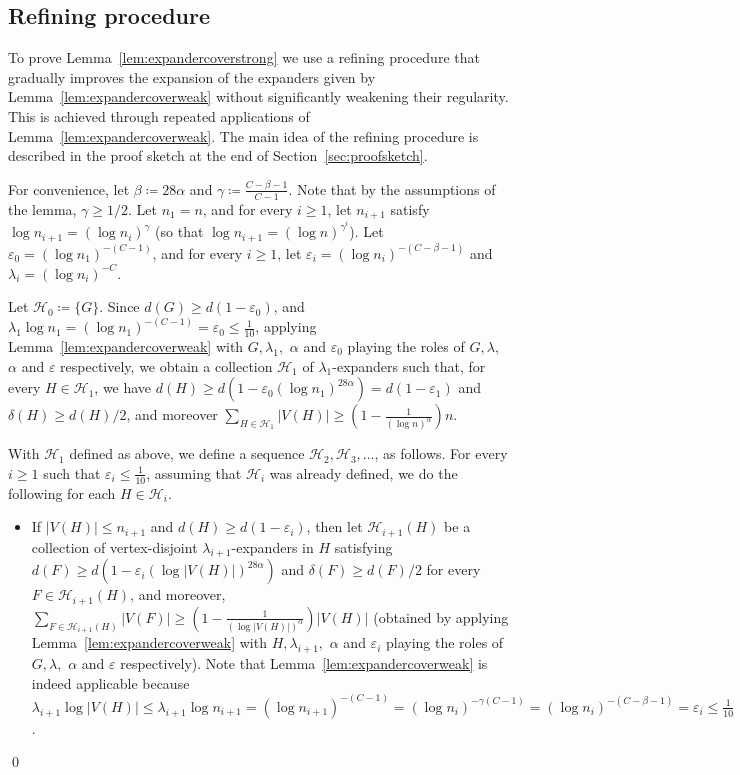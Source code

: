 \documentclass[10pt]{article}
\theoremstyle{plain}
\numberwithin{theorem}{section}
\theoremstyle{definition}
\theoremstyle{remark}
\renewenvironment{proof}[1][]{\begin{trivlist}
\item[\hspace{\labelsep}{\bf\noindent Proof#1.\/}] }{\qed\end{trivlist}}
\newcommand{\cH}{\mathcal{H}}
\newcommand{\eps}{\varepsilon}
\theoremstyle{plain}
\begin{document}
\subsection{Refining procedure}
 \label{subsec:refiningthepacking}


To prove Lemma~\ref{lem:expandercoverstrong} we use a refining procedure that gradually improves the expansion of the expanders given by Lemma~\ref{lem:expandercoverweak} without significantly weakening their regularity. This is achieved through repeated applications of Lemma~\ref{lem:expandercoverweak}. The main idea of the refining procedure is described in the proof sketch at the end of Section~\ref{sec:proofsketch}.

\begin{proof}[ of Lemma~\ref{lem:expandercoverstrong}]
	For convenience, let $\beta \coloneqq 28 \alpha$ and $\gamma \coloneqq \frac{C - \beta - 1}{C-1}$. 
	Note that by the assumptions of the lemma, $\gamma \ge 1/2$. Let $n_1 = n$, and for every $i \ge 1$, let $n_{i+1}$ satisfy $\log n_{i+1} = (\log n_{i})^{\gamma}$ (so that $\log n_{i+1} = (\log n)^{\gamma^{i}}$). Let $\eps_0 = (\log n_1)^{-(C - 1)}$, and for every $i \ge 1$, let $\eps_i = (\log n_i)^{-(C-\beta-1)}$ and $\lambda_i = (\log n_i)^{-C}$. 

	Let $\cH_0 \coloneqq \{G\}$. Since $d(G) \ge d(1 - \eps_0)$, and $\lambda_1 \log n_1 = (\log n_1)^{-(C - 1)} = \eps_0 \le \frac{1}{10}$, applying Lemma~\ref{lem:expandercoverweak} with $G, \lambda_{1},$ $\alpha$ and $\eps_{0}$ playing the roles of $G, \lambda,$ $\alpha$ and $\eps$ respectively, we obtain a collection $\cH_1$ of $\lambda_1$-expanders such that, for every $H \in \cH_1$, 
we have $d(H) \ge d(1-\eps_{0}(\log n_1)^{28\alpha}) = d(1-\eps_1)$ and 
$\delta(H) \ge d(H)/2$, and moreover $\sum_{H \in \cH_1} |V(H)| \ge (1-\frac{1}{(\log n)^{\alpha}})n$.

	With $\cH_1$ defined as above, we define a sequence $\cH_2, \cH_3, \ldots$, as follows.  For every $i \ge 1$ such that $\eps_i \le \frac{1}{10}$, assuming that $\cH_i$ was already defined, we do the following for each $H \in \cH_i$.
	\begin{itemize}
		\item[$\mathrm{(a)}_i$] If $|V(H)| \le n_{i+1}$ and $d(H) \ge d(1-\eps_{i})$, then let $\cH_{i+1}(H)$ be a collection of vertex-disjoint $\lambda_{i+1}$-expanders in $H$ satisfying $d(F) \ge d(1-\eps_{i} (\log |V(H)|)^{28 \alpha})$ and $\delta(F) \ge d(F)/2$ for every $F \in \cH_{i+1}(H)$, and moreover, $\sum_{F \in \cH_{i+1}(H)} |V(F)| \ge (1 - \frac{1}{(\log |V(H)|)^{\alpha}}) |V(H)|$ (obtained by applying Lemma~\ref{lem:expandercoverweak} with $H, \lambda_{i+1},$ $\alpha$ and $\eps_{i}$ playing the roles of $G, \lambda,$ $\alpha$ and $\eps$ respectively). Note that Lemma~\ref{lem:expandercoverweak} is indeed applicable because $\lambda_{i+1} \log |V(H)| \le \lambda_{i+1} \log n_{i+1} = (\log n_{i+1})^{-(C-1)} = (\log n_{i})^{-\gamma(C-1)} = (\log n_{i})^{-(C - \beta - 1)} = \eps_i \le \frac{1}{10}$.



\end{itemize}
\end{proof}
\end{document}
